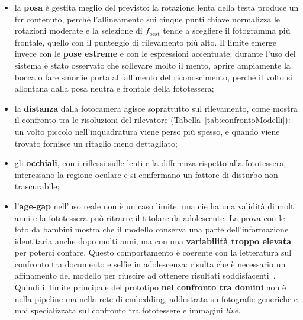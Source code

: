 \begin{itemize}
    \item la \textbf{posa} è gestita meglio del previsto: la rotazione lenta della testa produce un \gls{frr} contenuto, perché l'allineamento sui cinque punti chiave normalizza le rotazioni moderate e la selezione di $f_{\text{best}}$ tende a scegliere il fotogramma più frontale, quello con il punteggio di rilevamento più alto.
    Il limite emerge invece con le \textbf{pose estreme} e con le espressioni accentuate: durante l'uso del sistema è stato osservato che sollevare molto il mento, aprire ampiamente la bocca o fare smorfie porta al fallimento del riconoscimento, perché il volto si allontana dalla posa neutra e frontale della fototessera;
    \item la \textbf{distanza} dalla fotocamera agisce soprattutto sul rilevamento, come mostra il confronto tra le risoluzioni del rilevatore (Tabella~\ref{tab:confrontoModelli}): un volto piccolo nell'inquadratura viene perso più spesso, e quando viene trovato fornisce un ritaglio meno dettagliato;
    \item gli \textbf{occhiali}, con i riflessi sulle lenti e la differenza rispetto alla fototessera, interessano la regione oculare e si confermano un fattore di disturbo non trascurabile;
    \item l'\textbf{age-gap} nell'uso reale non è un caso limite: una \gls{cie} ha una validità di molti anni e la fototessera può ritrarre il titolare da adolescente.
    La prova con le foto da bambini mostra che il modello conserva una parte dell'informazione identitaria anche dopo molti anni, ma con una \textbf{variabilità troppo elevata} per poterci contare.
    Questo comportamento è coerente con la letteratura sul confronto tra documento e selfie in adolescenza: risulta che è necessario un affinamento del modello per riuscire ad ottenere risultati soddisfacenti~\cite{albieroIdentityDocumentSelfie2019a, shiDocFaceMatchingID2018}.
    Quindi il limite principale del prototipo \textbf{nel confronto tra domini} non è nella pipeline ma nella rete di embedding, addestrata su fotografie generiche e mai specializzata sul confronto tra fototessere e immagini \textit{live}.
\end{itemize}

